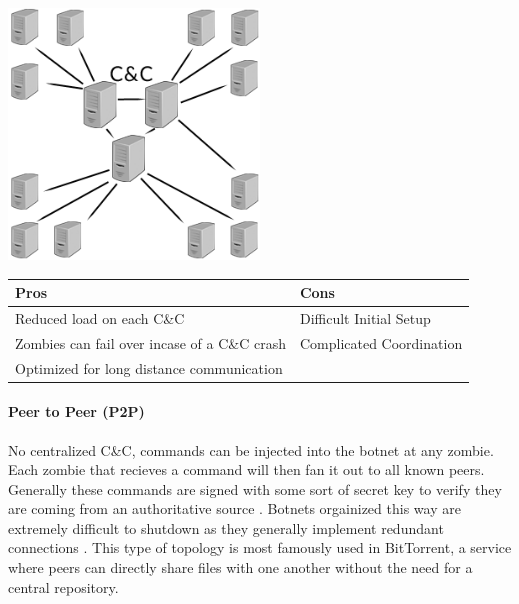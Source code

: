 \begin{center}
  \includegraphics[width=0.5\textwidth]{assets/multiservertopo.png}
  \label{fig:mulitserver_topo_fig}
\end{center}

\begin{tabular}{p{8cm} | p{8cm}}
  \textbf{Pros} & \textbf{Cons} \\ \hline
  \textbullet{}Reduced load on each C\&C                    & \textbullet{}Difficult Initial Setup \\
  \textbullet{}Zombies can fail over incase of a C\&C crash & \textbullet{}Complicated Coordination\\
  \textbullet{}Optimized for long distance communication    & \\
\end{tabular}

\paragraph{Peer to Peer (P2P) \cite{topology}}
No centralized C\&C, commands can be injected into the botnet at any zombie.
Each zombie that recieves a command will then fan it out to all known peers.
Generally these commands are signed with some sort of secret key to verify they
are coming from an authoritative source \cite{topology}. Botnets orgainized
this way are extremely difficult to shutdown as they generally implement redundant
connections \cite{topology}.  This type of topology is most famously used in BitTorrent,
a service where peers can directly share files with one another without the need for a central
repository.

